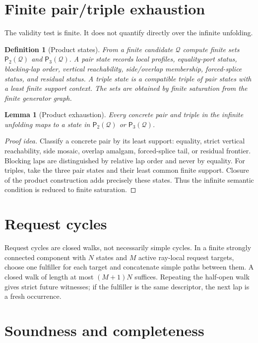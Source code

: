 \documentclass[11pt]{article}
\newtheorem{lemma}[theorem]{Lemma}
\newtheorem{definition}[theorem]{Definition}
\newcommand{\Q}{\mathcal Q}
\newcommand{\Pairs}{\mathsf P_2}
\newcommand{\Triples}{\mathsf P_3}
\begin{document}
\section{Finite pair/triple exhaustion}

The validity test is finite.  It does not quantify directly over the infinite unfolding.

\begin{definition}[Product states]
From a finite candidate $\Q$ compute finite sets $\Pairs(\Q)$ and $\Triples(\Q)$.
A pair state records local profiles, equality-port status, blocking-lap order, vertical reachability, side/overlap membership, forced-splice status, and residual status.  A triple state is a compatible triple of pair states with a least finite support context.  The sets are obtained by finite saturation from the finite generator graph.
\end{definition}

\begin{lemma}[Product exhaustion]
Every concrete pair and triple in the infinite unfolding maps to a state in $\Pairs(\Q)$ or $\Triples(\Q)$.
\end{lemma}

\begin{proof}[Proof idea]
Classify a concrete pair by its least support: equality, strict vertical reachability, side mosaic, overlap amalgam, forced-splice tail, or residual frontier.  Blocking laps are distinguished by relative lap order and never by equality.  For triples, take the three pair states and their least common finite support.  Closure of the product construction adds precisely these states.  Thus the infinite semantic condition is reduced to finite saturation.
\end{proof}

\section{Request cycles}

Request cycles are closed walks, not necessarily simple cycles.  In a finite strongly connected component with $N$ states and $M$ active ray-local request targets, choose one fulfiller for each target and concatenate simple paths between them.  A closed walk of length at most $(M+1)N$ suffices.  Repeating the half-open walk gives strict future witnesses; if the fulfiller is the same descriptor, the next lap is a fresh occurrence.

\section{Soundness and completeness}
\end{document}
